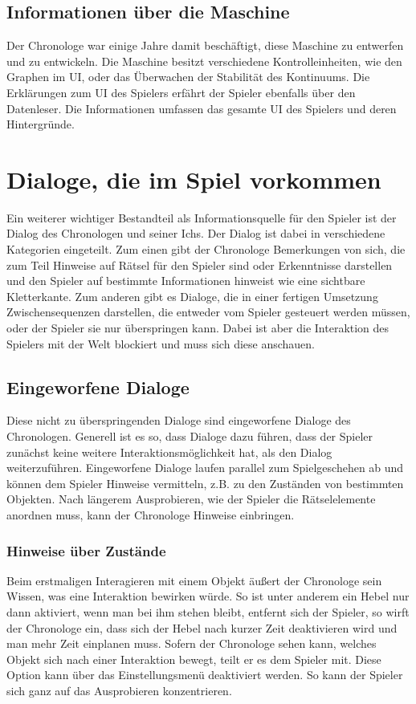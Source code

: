 \subsection{Informationen über die Maschine}
Der Chronologe war einige Jahre damit beschäftigt, diese Maschine zu entwerfen und zu entwickeln. Die Maschine besitzt verschiedene Kontrolleinheiten, wie den Graphen im \ac{UI}, oder das Überwachen der Stabilität des Kontinuums. Die Erklärungen zum \ac{UI} des Spielers erfährt der Spieler ebenfalls über den Datenleser. Die Informationen umfassen das gesamte \ac{UI} des Spielers und deren Hintergründe.

\section{Dialoge, die im Spiel vorkommen}
Ein weiterer wichtiger Bestandteil als Informationsquelle für den Spieler ist der Dialog des Chronologen und seiner Ichs. Der Dialog ist dabei in verschiedene Kategorien eingeteilt.
Zum einen gibt der Chronologe Bemerkungen von sich, die zum Teil Hinweise auf Rätsel für den Spieler sind oder Erkenntnisse darstellen und den Spieler auf bestimmte Informationen hinweist wie eine sichtbare Kletterkante.
Zum anderen gibt es Dialoge, die in einer fertigen Umsetzung Zwischensequenzen darstellen, die entweder vom Spieler gesteuert werden müssen, oder der Spieler sie nur überspringen kann. Dabei ist aber die Interaktion des Spielers mit der Welt blockiert und muss sich diese anschauen.

\subsection{Eingeworfene Dialoge}\label{sec:throw-in-dialogues}
Diese nicht zu überspringenden Dialoge sind eingeworfene Dialoge des Chronologen. Generell ist es so, dass Dialoge dazu führen, dass der Spieler zunächst keine weitere Interaktionsmöglichkeit hat, als den Dialog weiterzuführen. Eingeworfene Dialoge laufen parallel zum Spielgeschehen ab und können dem Spieler Hinweise vermitteln, z.B. zu den Zuständen von bestimmten Objekten. Nach längerem Ausprobieren, wie der Spieler die Rätselelemente anordnen muss, kann der Chronologe Hinweise einbringen.

\subsubsection{Hinweise über Zustände}
Beim erstmaligen Interagieren mit einem Objekt äußert der Chronologe sein Wissen, was eine Interaktion bewirken würde. So ist unter anderem ein Hebel nur dann aktiviert, wenn man bei ihm stehen bleibt, entfernt sich der Spieler, so wirft der Chronologe ein, dass sich der Hebel nach kurzer Zeit deaktivieren wird und man mehr Zeit einplanen muss. Sofern der Chronologe sehen kann, welches Objekt sich nach einer Interaktion bewegt, teilt er es dem Spieler mit. Diese Option kann über das Einstellungsmenü deaktiviert werden. So kann der Spieler sich ganz auf das Ausprobieren konzentrieren.

